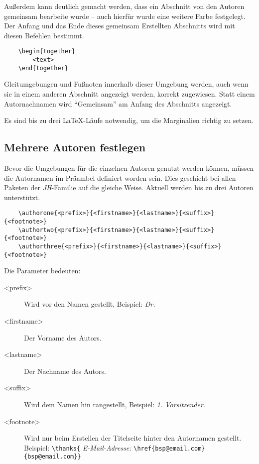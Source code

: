 \documentclass[%
	fontsize=10pt, 
	DIV=8, 
]{scrartcl}
\begin{document}
Außerdem kann deutlich gemacht werden, dass ein Abschnitt von den Autoren gemeinsam bearbeite wurde -- auch hierfür wurde eine weitere Farbe festgelegt. Der Anfang und das Ende dieses gemeinsam Erstellten Abschnitts wird mit diesen Befehlen bestimmt. 
\begin{verbatim}
	\begin{together}
		<text>
	\end{together}
\end{verbatim}

Gleitumgebungen und Fußnoten innerhalb dieser Umgebung werden, auch wenn sie in einem anderen Abschnitt angezeigt werden, korrekt zugewiesen. Statt einem Autornachnamen wird "`Gemeinsam"' am Anfang des Abschnitts angezeigt.

Es sind bis zu drei \LaTeX -Läufe notwendig, um die Marginalien richtig zu setzen.

\subsection{Mehrere Autoren festlegen}
Bevor die Umgebungen für die einzelnen Autoren genutzt werden können, müssen die Autornamen im Präambel definiert worden sein. Dies geschieht bei allen Paketen der \textit{JH}-Familie auf die gleiche Weise. Aktuell werden bis zu drei Autoren unterstützt.

\begingroup\small
\begin{verbatim}
	\authorone{<prefix>}{<firstname>}{<lastname>}{<suffix>}{<footnote>}
	\authortwo{<prefix>}{<firstname>}{<lastname>}{<suffix>}{<footnote>}
	\authorthree{<prefix>}{<firstname>}{<lastname>}{<suffix>}{<footnote>}
\end{verbatim}
\endgroup

Die Parameter bedeuten:
\begin{description}
	\item[<prefix>] Wird vor den Namen gestellt, Beispiel: \textit{Dr.}
	\item[<firstname>] Der Vorname des Autors.
	\item[<lastname>] Der Nachname des Autors.
	\item[<suffix>] Wird dem Namen hin rangestellt, Beispiel: \textit{1. Vorsitzender}.
	\item[<footnote>] Wird nur beim Erstellen der Titelseite hinter den Autornamen gestellt. Beispiel: \verb+\thanks{+ \textit{E-Mail-Adresse:} \verb+\href{bsp@email.com}{bsp@email.com}}+
\end{description}
\end{document}
